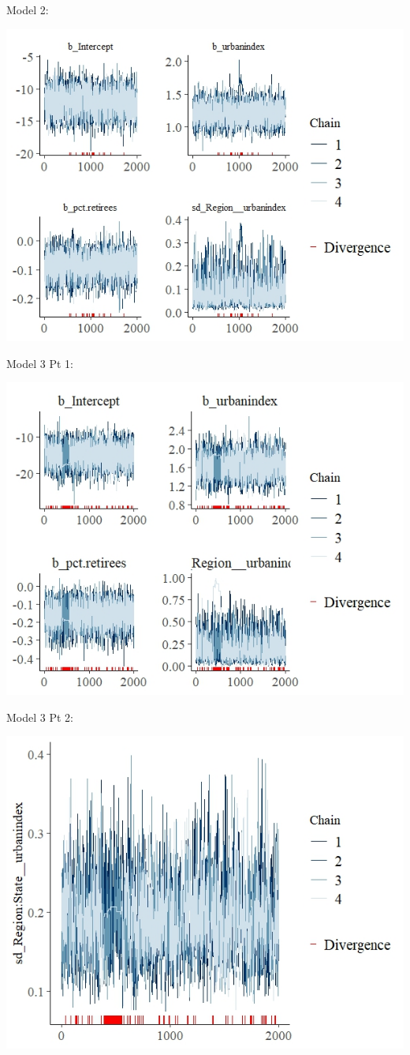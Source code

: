 \documentclass[12pt]{article}
\begin{document}
Model 2:

\includegraphics[scale = 1.4]{trace_plots/trace_model2.jpeg}

Model 3 Pt 1:

\includegraphics[scale = 1.25]{trace_plots/trace_model3_part1.jpeg}


Model 3 Pt 2: 

\includegraphics[scale = 1.25]{trace_plots/trace_model3_part2.jpeg}
\end{document}
